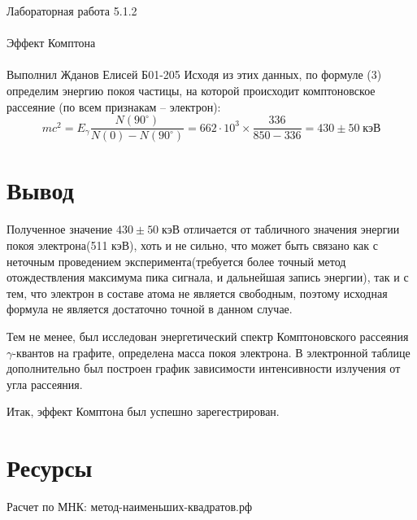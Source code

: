 \documentclass{astroedu-lab}
\begin{document}
\begin{problem}{\huge Лабораторная работа 5.1.2\\\\Эффект Комптона\\\\Выполнил Жданов Елисей Б01-205}
Исходя из этих данных, по формуле (3) определим энергию покоя частицы, на которой происходит комптоновское рассеяние (по всем признакам -- электрон):
	\[m c^2 = E_\gamma \dfrac{N(90^\circ)}{N(0)-N(90^\circ)} = 662\cdot 10^3\times \dfrac{336}{850-336} = 430 \pm 50 \; \text{кэВ} \]
	
	





\section{Вывод}

Полученное значение $430 \pm 50 \; \text{кэВ}$ отличается от табличного значения энергии покоя электрона(511 кэВ), хоть и не сильно, что может быть связано как с неточным проведением эксперимента(требуется более точный метод отождествления максимума пика сигнала, и дальнейшая запись энергии), так и с тем, что электрон  в составе атома не является свободным, поэтому исходная формула не является достаточно точной в данном случае.

Тем не менее, был исследован энергетический спектр Комптоновского рассеяния $\gamma$-квантов на графите, определена масса покоя электрона. В электронной таблице дополнительно был построен график зависимости интенсивности излучения от угла рассеяния.

Итак, эффект Комптона был успешно зарегестрирован.




\section{Ресурсы}

Расчет по МНК: метод-наименьших-квадратов.рф


\end{problem}
\end{document}
